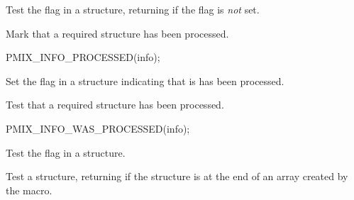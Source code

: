 Test the  flag in a  structure, returning  if the flag is \textit{not} set.


Mark that a required  structure has been processed.

\cspecificstart
\begin{codepar}
PMIX_INFO_PROCESSED(info);
\end{codepar}
\cspecificend

\begin{arglist}
\end{arglist}

Set the  flag in a  structure indicating that is has been processed.


Test that a required  structure has been processed.

\cspecificstart
\begin{codepar}
PMIX_INFO_WAS_PROCESSED(info);
\end{codepar}
\cspecificend

\begin{arglist}
\end{arglist}

Test the  flag in a  structure.


Test a  structure, returning  if the structure is at the end of an array created by the  macro.


\begin{arglist}
\end{arglist}

